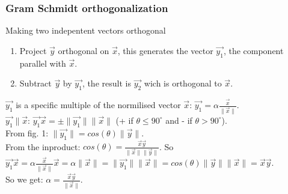 \begin{frame}
	\frametitle{Gram Schmidt orthogonalization}
	\begin{block}{Making two indepentent vectors orthogonal}
		\begin{enumerate}
			\item Project $\overrightarrow{y}$ orthogonal on $\overrightarrow{x}$, this generates the vector $\overrightarrow{y_1}$, the component parallel with $\overrightarrow{x}$.
			\item Subtract $\overrightarrow{y}$ by $\overrightarrow{y_1}$, the result is $\overrightarrow{y_2}$ wich is orthogonal to $\overrightarrow{x}$.
		\end{enumerate}
		$\overrightarrow{y_1}$ is a specific multiple of the normilised vector $\overrightarrow{x}$:
		$\overrightarrow{y_1}=\alpha\frac{\overrightarrow{x}}{\|\overrightarrow{x}\|}$.\\
		$\overrightarrow{y_1}\parallel\overrightarrow{x}$: $\overrightarrow{y_1}\overrightarrow{x}=\pm\|\overrightarrow{y_1}\|\|\overrightarrow{x}\|$ (+ if $\theta\leq90^{\circ}$ and - if $\theta>90^{\circ}$).\\
		From fig. 1: $\|\overrightarrow{y_1}\|=cos(\theta)\|\overrightarrow{y}\|$.\\
		From the inproduct: $cos(\theta)=\frac{\overrightarrow{x}\overrightarrow{y}}{\|\overrightarrow{x}\|\|\overrightarrow{y}\|}$.
		So $\overrightarrow{y_1}\overrightarrow{x}=\alpha\frac{\overrightarrow{x}}{\|\overrightarrow{x}\|}\overrightarrow{x}=\alpha\|\overrightarrow{x}\|=\|\overrightarrow{y_1}\|\|\overrightarrow{x}\|=cos(\theta)\|\overrightarrow{y}\|\|\overrightarrow{x}\|=\overrightarrow{x}\overrightarrow{y}$.\\
		So we get: $\alpha=\frac{\overrightarrow{x}\overrightarrow{y}}{\|\overrightarrow{x}\|}$.
	\end{block} 
\end{frame}

